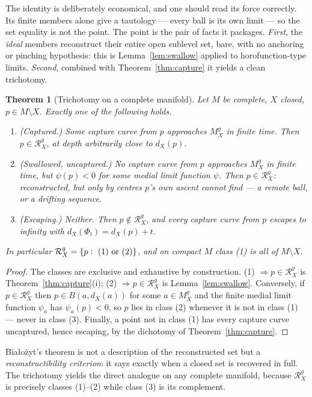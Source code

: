 \documentclass[11pt]{article}
\newtheorem{theorem}{Theorem}[section]
\theoremstyle{remark}
\newcommand{\X}{X}
\newcommand{\Mg}{M^{g}_{\X}}
\newcommand{\Rg}{\mathcal{R}^{g}_{\X}}
\newcommand{\dX}{d_{\X}}
\begin{document}
The identity is deliberately economical, and one should read its
force correctly. Its finite members alone give a tautology --- every
ball is its own limit --- so the set equality is not the point. The
point is the pair of facts it packages. \emph{First}, the
\emph{ideal} members reconstruct their entire open sublevel set,
bare, with no anchoring or pinching hypothesis: this is
Lemma~\ref{lem:swallow} applied to horofunction-type limits.
\emph{Second}, combined with Theorem~\ref{thm:capture} it yields a
clean trichotomy.

\begin{theorem}[Trichotomy on a complete manifold]\label{thm:trichotomy}
Let $M$ be complete, $\X$ closed, $p\in M\setminus\X$. Exactly one of
the following holds.
\begin{enumerate}[label=\textup{(\arabic*)}]
\item\emph{(Captured.)} Some capture curve from $p$ approaches $\Mg$
in finite time. Then $p\in\Rg$, at depth arbitrarily close to
$\dX(p)$.
\item\emph{(Swallowed, uncaptured.)} No capture curve from $p$
approaches $\Mg$ in finite time, but $\psi(p)<0$ for some medial limit
function $\psi$. Then $p\in\Rg$: reconstructed, but only by centres
$p$'s own ascent cannot find --- a remote ball, or a drifting sequence.
\item\emph{(Escaping.)} Neither. Then $p\notin\Rg$, and every capture
curve from $p$ escapes to infinity with $\dX(\Phi_{t})=\dX(p)+t$.
\end{enumerate}
In particular $\Rg=\{p:\ \textup{(1) or (2)}\}$, and on compact $M$
class \textup{(1)} is all of $M\setminus\X$.
\end{theorem}

\begin{proof}
The classes are exclusive and exhaustive by construction. (1)
$\Rightarrow p\in\Rg$ is Theorem~\ref{thm:capture}(i); (2)
$\Rightarrow p\in\Rg$ is Lemma~\ref{lem:swallow}. Conversely, if
$p\in\Rg$ then $p\in B(a,\dX(a))$ for some $a\in\Mg$ and the finite
medial limit function $\psi_{a}$ has $\psi_{a}(p)<0$, so $p$ lies in
class (2) whenever it is not in class (1) --- never in class (3).
Finally, a point not in class (1) has every capture curve uncaptured,
hence escaping, by the dichotomy of Theorem~\ref{thm:capture}.
\end{proof}

Bia\l{}o\.zyt's theorem is not a description of the reconstructed set
but a \emph{reconstructibility criterion}: it says exactly when a
closed set is recovered in full. The trichotomy yields the direct
analogue on any complete manifold, because $\Rg$ is precisely classes
(1)--(2) while class (3) is its complement.
\end{document}
